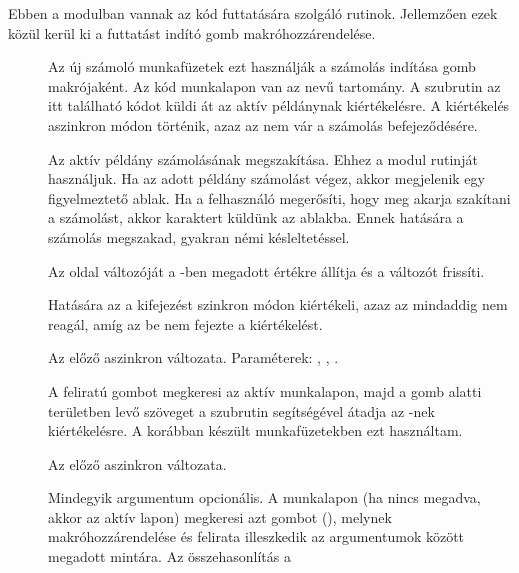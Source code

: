 Ebben a modulban vannak az  kód futtatására szolgáló
rutinok. Jellemzően ezek közül kerül 
ki a futtatást indító gomb makróhozzárendelése.
\begin{description}
\item[] Az új számoló munkafüzetek ezt használják a számolás
  indítása gomb makrójaként. Az  kód munkalapon van az  nevű
  tartomány. A szubrutin az itt található  kódot küldi át az aktív 
  példánynak kiértékelésre. A kiértékelés aszinkron módon történik,
  azaz az  nem vár a számolás befejeződésére.  
\item[] Az aktív  példány számolásának
  megszakítása. Ehhez a  modul  rutinját
  használjuk. Ha az adott  példány számolást végez, akkor
  megjelenik egy figyelmeztető ablak.  Ha a
  felhasználó megerősíti, hogy meg akarja szakítani a számolást, akkor
   karaktert küldünk az  ablakba. Ennek hatására
  a számolás megszakad, gyakran némi késleltetéssel.  
\item[] Az  oldal 
  változóját a -ben megadott értékre állítja és a 
  változót frissíti. %
\item[] Hatására
  az  a  kifejezést szinkron módon 
  kiértékeli, azaz az  mindaddig nem reagál, amíg az  be nem
  fejezte a kiértékelést.
\item[] Az előző aszinkron
  változata. Paraméterek: , , . 
\item[] A
   feliratú 
  gombot megkeresi az aktív munkalapon, majd a gomb alatti területben
  levő szöveget a   szubrutin segítségével átadja az
  -nek kiértékelésre.  A korábban készült munkafüzetekben ezt
  használtam.
\item[] Az előző
  aszinkron változata.
\item[] Mindegyik argumentum opcionális. A   
  munkalapon (ha nincs megadva, akkor az aktív lapon) megkeresi azt
  gombot (), melynek makróhozzárendelése és felirata illeszkedik
  az argumentumok között megadott mintára. Az összehasonlítás a 

\end{description}
